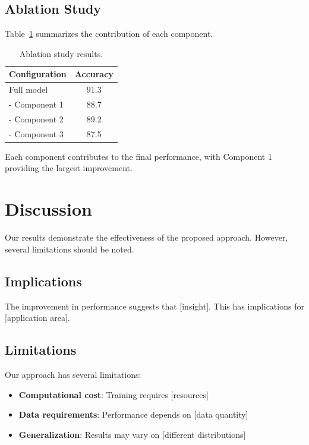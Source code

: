 \documentclass[conference]{IEEEtran}
\theoremstyle{plain}
\theoremstyle{definition}
\begin{document}
\subsection{Ablation Study}

Table~\ref{tab:ablation} summarizes the contribution of each component.

\begin{table}[htbp]
\caption{Ablation study results.}
\label{tab:ablation}
\begin{center}
\begin{tabular}{|l|c|}
\hline
\textbf{Configuration} & \textbf{Accuracy} \\
\hline
Full model & 91.3 \\
- Component 1 & 88.7 \\
- Component 2 & 89.2 \\
- Component 3 & 87.5 \\
\hline
\end{tabular}
\end{center}
\end{table}

Each component contributes to the final performance, with Component 1 
providing the largest improvement.

\section{Discussion}
\label{sec:discussion}

Our results demonstrate the effectiveness of the proposed approach. 
However, several limitations should be noted.

\subsection{Implications}

The improvement in performance suggests that [insight]. This has 
implications for [application area].

\subsection{Limitations}

Our approach has several limitations:
\begin{itemize}
  \item \textbf{Computational cost}: Training requires [resources]
  \item \textbf{Data requirements}: Performance depends on [data quantity]
  \item \textbf{Generalization}: Results may vary on [different distributions]
\end{itemize}
\end{document}

